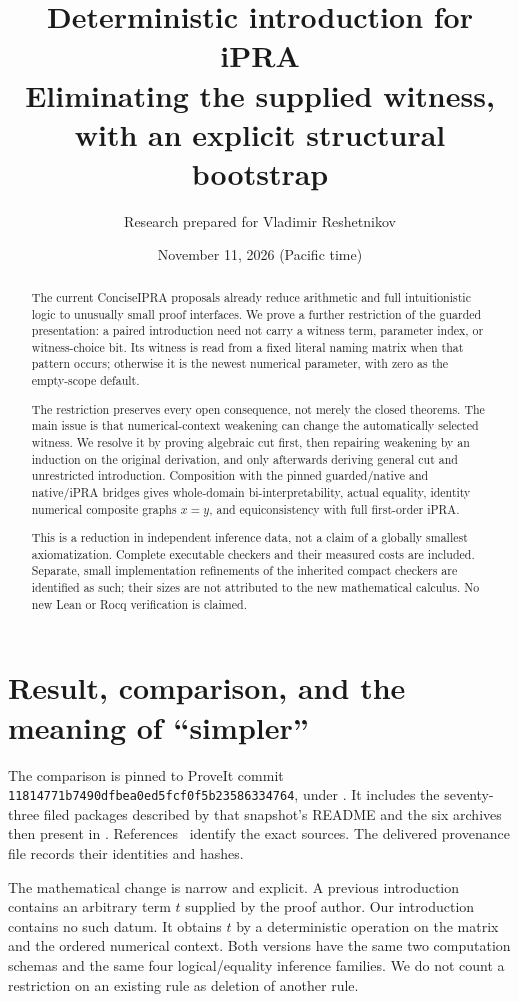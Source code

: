 \documentclass[11pt,letterpaper]{article}
\title{\color{ink}Deterministic introduction for iPRA\\[5pt]
\large Eliminating the supplied witness, with an explicit structural bootstrap}
\author{Research prepared for Vladimir Reshetnikov}
\date{November 11, 2026 (Pacific time)}
\theoremstyle{definition}\newtheorem{definition}[theorem]{Definition}
\theoremstyle{remark}\newtheorem{remark}[theorem]{Remark}
\begin{document}
\maketitle
\begin{abstract}
The current ConciseIPRA proposals already reduce arithmetic and full
intuitionistic logic to unusually small proof interfaces. We prove a further
restriction of the guarded presentation: a paired introduction need not carry
a witness term, parameter index, or witness-choice bit. Its witness is read
from a fixed literal naming matrix when that pattern occurs; otherwise it is
the newest numerical parameter, with zero as the empty-scope default.

The restriction preserves every open consequence, not merely the closed
theorems. The main issue is that numerical-context weakening can change the
automatically selected witness. We resolve it by proving algebraic cut first,
then repairing weakening by an induction on the original derivation, and only
afterwards deriving general cut and unrestricted introduction. Composition
with the pinned guarded/native and native/iPRA bridges gives whole-domain
bi-interpretability, actual equality, identity numerical composite graphs
$x=y$, and equiconsistency with full first-order iPRA.

This is a reduction in independent inference data, not a claim of a globally
smallest axiomatization. Complete executable checkers and their measured costs
are included. Separate, small implementation refinements of the inherited
compact checkers are identified as such; their sizes are not attributed to
the new mathematical calculus. No new Lean or Rocq verification is claimed.
\end{abstract}
\setcounter{tocdepth}{1}
\tableofcontents
\clearpage

\section{Result, comparison, and the meaning of ``simpler''}

The comparison is pinned to ProveIt commit
\texttt{11814771b7490dfbea0ed5fcf0f5b23586334764}, under
. It includes the
seventy-three filed packages described by that snapshot's README and the six
archives then present in . References~\cite{repo,incoming}
identify the exact sources. The delivered provenance file records their
identities and hashes.

The mathematical change is narrow and explicit. A previous introduction
contains an arbitrary term $t$ supplied by the proof author. Our introduction
contains no such datum. It obtains $t$ by a deterministic operation on the
matrix and the ordered numerical context. Both versions have the same two
computation schemas and the same four logical/equality inference families.
We do not count a restriction on an existing rule as deletion of another rule.
\end{document}

